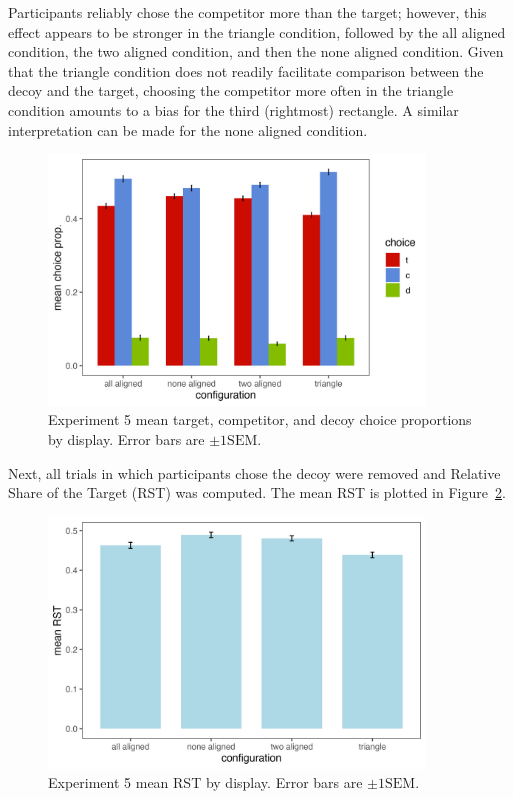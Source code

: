 Participants reliably chose the competitor more than the target; however, this effect appears to be stronger in the triangle condition, followed by the all aligned condition, the two aligned condition, and then the none aligned condition. Given that the triangle condition does not readily facilitate comparison between the decoy and the target, choosing the competitor more often in the triangle condition amounts to a bias for the third (rightmost) rectangle. A similar interpretation can be made for the none aligned condition. 

\begin{figure}
   \centering
   \includegraphics[width=100mm]{figures/comparability_crit_choice_by_config.jpeg}
   \caption{Experiment 5 mean target, competitor, and decoy choice proportions by display. Error bars are $\pm1\mathrm{SEM}$.}
   \label{fig:comparability_crit_mean_tcd_choices}
\end{figure}

Next, all trials in which participants chose the decoy were removed and Relative Share of the Target (RST) was computed. The mean RST is plotted in Figure~\ref{fig:comparability_crit_mean_target_choices}.

\begin{figure}
   \centering
   \includegraphics[width=100mm]{figures/comparability_crit_rst_by_config.jpeg}
   \caption{Experiment 5 mean RST by display. Error bars are $\pm1\mathrm{SEM}$.}
   \label{fig:comparability_crit_mean_target_choices}
\end{figure}

